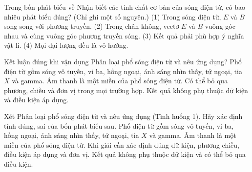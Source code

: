 \begin{ex}
Trong bốn phát biểu về Nhận biết các tính chất cơ bản của sóng điện từ, có bao nhiêu phát biểu đúng? (Chỉ ghi một số nguyên.) (1) Trong sóng điện từ, $E$ và $B$ song song với phương truyền. (2) Trong chân không, vectơ $E$ và $B$ vuông góc nhau và cùng vuông góc phương truyền sóng. (3) Kết quả phải phù hợp ý nghĩa vật lí. (4) Mọi đại lượng đều là vô hướng.
\end{ex}

\begin{ex}
Kết luận đúng khi vận dụng Phân loại phổ sóng điện từ và nêu ứng dụng?
\choice
{\True Phổ điện từ gồm sóng vô tuyến, vi ba, hồng ngoại, ánh sáng nhìn thấy, tử ngoại, tia $X$ và gamma.}
{Âm thanh là một miền của phổ sóng điện từ.}
{Có thể bỏ qua phương, chiều và đơn vị trong mọi trường hợp.}
{Kết quả không phụ thuộc dữ kiện và điều kiện áp dụng.}
\end{ex}

\begin{ex}
Xét Phân loại phổ sóng điện từ và nêu ứng dụng (Tình huống 1). Hãy xác định tính đúng, sai của bốn phát biểu sau.
\choiceTF
{\True Phổ điện từ gồm sóng vô tuyến, vi ba, hồng ngoại, ánh sáng nhìn thấy, tử ngoại, tia $X$ và gamma.}
{Âm thanh là một miền của phổ sóng điện từ.}
{\True Khi giải cần xác định đúng dữ kiện, phương chiều, điều kiện áp dụng và đơn vị.}
{Kết quả không phụ thuộc dữ kiện và có thể bỏ qua điều kiện.}
\end{ex}

